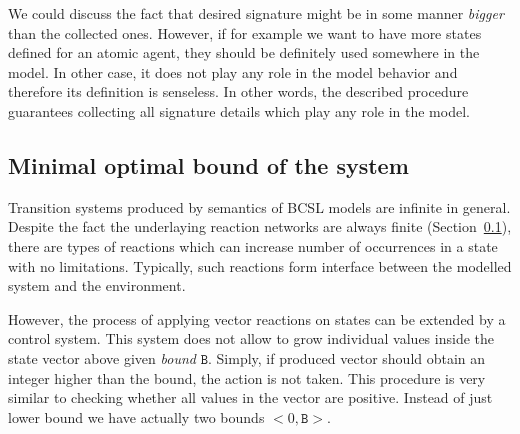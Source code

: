 \documentclass[12pt]{fithesis2}
\newcounter{counter}[section]
\renewcommand{\thecounter}{\thesection.\arabic{counter}}
\newenvironment{proof}{\bigskip\refstepcounter{counter}\noindent\textbf{Proof \thecounter}\par\nopagebreak}{\bigskip}
\newcommand*{\QEDA}{\hfill\ensuremath{\blacksquare}}%
\begin{document}
We could discuss the fact that desired signature might be in some manner \emph{bigger} than the collected ones. However, if for example we want to have more states defined for an atomic agent, they should be definitely used somewhere in the model. In other case, it does not play any role in the model behavior and therefore its definition is senseless. In other words, the described procedure guarantees collecting all signature details which play any role in the model.


\subsection{Minimal optimal bound of the system}
\label{optimal_bound}

Transition systems produced by semantics of BCSL models are infinite in general. Despite the fact the underlaying reaction networks are always finite (Section~\ref{optimal_bound}), there are types of reactions which can increase number of occurrences in a state with no limitations. Typically, such reactions form interface between the modelled system and the environment.

However, the process of applying vector reactions on states can be extended by a control system. This system does not allow to grow individual values inside the state vector above given \emph{bound} $\mathtt{B}$. Simply, if produced vector should obtain an integer higher than the bound, the action is not taken. This procedure is very similar to checking whether all values in the vector are positive. Instead of just lower bound we have actually two bounds $<0, \mathtt{B}>$.
\end{document}
